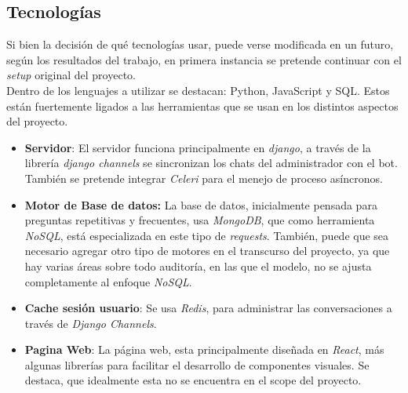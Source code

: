     \subsection{Tecnologías}
        Si bien la decisión de qué tecnologías usar, puede verse modificada en un futuro, según los resultados del trabajo, en primera instancia se pretende continuar con el \textit{setup} original del proyecto.\\
        Dentro de los lenguajes a utilizar se destacan: Python, JavaScript y SQL. Estos están fuertemente ligados a las herramientas que se usan en los distintos aspectos del proyecto.
        \begin{itemize}
            \item \textbf{Servidor}: El servidor funciona principalmente en \textit{django}, a través de la librería \textit{django channels} se sincronizan los chats del administrador con el bot. También se pretende integrar \textit{Celeri} para el menejo de proceso asíncronos.
            \item \textbf{Motor de Base de datos:} La base de datos, inicialmente pensada para preguntas repetitivas y frecuentes, usa \textit{MongoDB}, que como herramienta \textit{NoSQL}, está especializada en este tipo de \textit{requests}. También, puede que sea necesario agregar otro tipo de motores en el transcurso del proyecto, ya que hay varias áreas sobre todo auditoría, en las que el modelo, no se ajusta completamente al enfoque \textit{NoSQL}.
            \item \textbf{Cache sesión usuario}: Se usa \textit{Redis}, para administrar las conversaciones a través de \textit{Django Channels}.
            \item \textbf{Pagina Web}: La página web, esta principalmente diseñada en \textit{React}, más algunas librerías para facilitar el desarrollo de componentes visuales. Se destaca, que idealmente esta no se encuentra en el scope del proyecto.
        \end{itemize}

